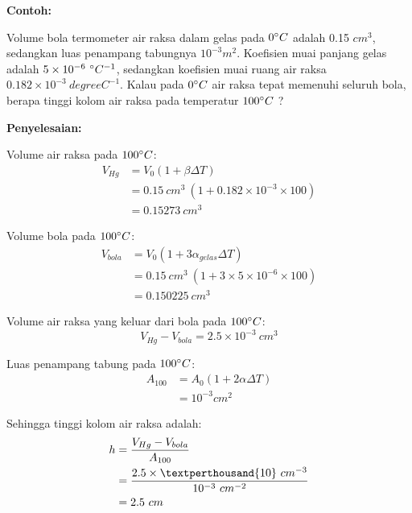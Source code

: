 \documentclass[twocolumn, 11pt]{article}%
\begin{document}
        \textbf{Contoh:}

        Volume bola termometer air raksa dalam gelas pada $0\degree C$ adalah 0.15 $cm^3$, sedangkan luas penampang tabungnya $10^{-3} m^2$. Koefisien muai panjang gelas adalah $5\times10^{-6}\ \degree C^{-1}$, sedangkan koefisien muai ruang air raksa $0.182 \times 10^{-3}\ degree C^{-1}$. Kalau pada $0\degree C$ air raksa tepat memenuhi seluruh bola, berapa tinggi kolom air raksa pada temperatur $100 \degree C$ ?

        \textbf{Penyelesaian:}

        Volume air raksa pada $100 \degree C$:
        \begin{equation*}
            \begin{split}
                V_{Hg} &= V_0 (1+ \beta \Delta T)\\
                &= 0.15\ cm^3\ (1+ 0.182 \times 10^{-3} \times 100)\\
                &= 0.15273\ cm^3
            \end{split}
        \end{equation*}
        
        Volume bola pada $100 \degree C$:
        \begin{equation*}
            \begin{split}
                V_{bola} &= V_0 (1+ 3\alpha_{gelas} \Delta T)\\
                &= 0.15\ cm^3\ (1+ 3 \times 5 \times 10^{-6} \times 100)\\
                &= 0.150225\ cm^3
            \end{split}
        \end{equation*}
        
        Volume air raksa yang keluar dari bola pada $100 \degree C$:
        \begin{equation*}
            V_{Hg} - V_{bola} = 2.5 \times 10^{-3}\ cm^3
        \end{equation*}

        Luas penampang tabung pada $100 \degree C$:
        \begin{equation*}
            \begin{split}
                A_{100} &= A_0 (1+2\alpha \Delta T)\\
                &= 10^{-3} cm^2
            \end{split}
        \end{equation*}

        Sehingga tinggi kolom air raksa adalah:
        \begin{equation*}
            \begin{split}
                h &= \frac{V_{Hg} - V_{bola}}{A_{100}}\\
                &= \frac{2.5 \times \textperthousand{10}\ cm^{-3}}{10^{-3}\ cm^{-2}}\\
                &= 2.5\ cm
            \end{split}
        \end{equation*}
\end{document}
